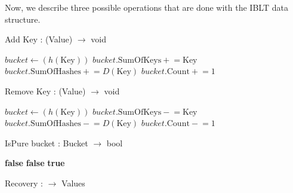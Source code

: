 Now, we describe three possible operations that are done with the IBLT data structure.
\begin{algorithm}
\caption{Add Key : (Value) $\to$ void}
\begin{algorithmic}[1]
        \State $bucket \gets (h(\text{Key}))$
        \State $bucket.\text{SumOfKeys} \mathrel{+}= \text{Key}$
        \State $bucket.\text{SumOfHashes} \mathrel{+}= D(\text{Key})$
        \State $bucket.\text{Count} \mathrel{+}= 1$
    \EndFor
\EndProcedure
\end{algorithmic}
\end{algorithm}

\begin{algorithm}
\caption{Remove Key : (Value) $\to$ void}
\begin{algorithmic}[1]
        \State $bucket \gets (h(\text{Key}))$
        \State $bucket.\text{SumOfKeys} \mathrel{-}= \text{Key}$
        \State $bucket.\text{SumOfHashes} \mathrel{-}= D(\text{Key})$
        \State $bucket.\text{Count} \mathrel{-}= 1$
    \EndFor
\EndProcedure
\end{algorithmic}
\end{algorithm}

\begin{algorithm}
\caption{IsPure bucket : Bucket $\to$ bool}
\begin{algorithmic}[1]
        \State \Return \textbf{false}
    \EndIf
        \State \Return \textbf{false}
    \EndIf
    \State \Return \textbf{true}
\EndFunction
\end{algorithmic}
\end{algorithm}

\begin{algorithm}
\caption{Recovery : $\to$ Values}
\begin{algorithmic}[1]
    \Repeat
                    \State {}
                    \State {}
                \EndIf
            \EndIf
        \EndFor
\EndProcedure
\end{algorithmic}
\end{algorithm}

